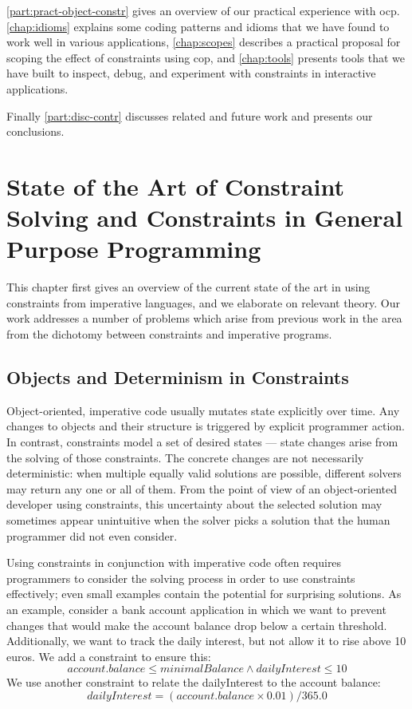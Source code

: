 \autoref{part:pract-object-constr} gives an overview of our practical experience
with \ac{ocp}. \autoref{chap:idioms} explains some coding patterns and idioms
that we have found to work well in various applications, \autoref{chap:scopes}
describes a practical proposal for scoping the effect of constraints using
\acrlong{cop}, and \autoref{chap:tools} presents tools that we have built to
inspect, debug, and experiment with constraints in interactive applications.

Finally \autoref{part:disc-contr} discusses related and future work and
presents our conclusions.

\chapter{State of the Art of Constraint Solving and Constraints in General Purpose Programming}
\label{sec:relev-theory}

This chapter first gives an overview of the current state of the art
in using constraints from imperative languages, and we elaborate on
relevant theory. Our work addresses a number of problems which arise
from previous work in the area from the dichotomy between constraints
and imperative programs.

\section{Objects and Determinism in Constraints}
\label{sec:expectations}

Object-oriented, imperative code usually mutates state explicitly over
time. Any changes to objects and their structure is triggered by
explicit programmer action. In contrast, constraints model a set of
desired states --- state changes arise from the solving of those
constraints. The concrete changes are not necessarily deterministic:
when multiple equally valid solutions are possible, different solvers
may return any one or all of them. From the point of view of an
object-oriented developer using constraints, this uncertainty about
the selected solution may sometimes appear unintuitive when the solver
picks a solution that the human programmer did not even consider.

Using constraints in conjunction with imperative code often requires
programmers to consider the solving process in order to use
constraints effectively; even small examples contain the potential for
surprising solutions. As an example, consider a bank account
application in which we want to prevent changes that would make the
account balance drop below a certain threshold. Additionally, we want
to track the daily interest, but not allow it to rise above 10
euros. We add a constraint to ensure this:
\[
account.balance \leq minimalBalance \wedge dailyInterest \leq 10
\]
We use another constraint to relate the dailyInterest to the account
balance:
\[
dailyInterest = (account.balance \times 0.01) / 365.0
\]

